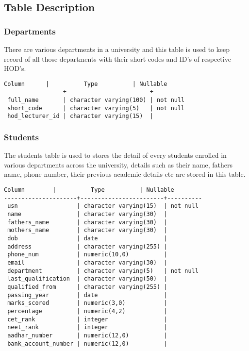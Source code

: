 \subsection{Table Description}

\subsubsection{Departments}

There are various departments in a university and this table is used to keep
record of all those departments with their short codes and ID's of respective
HOD's.

\begin{lstlisting}[basicstyle=\small]
     Column      |          Type          | Nullable
-----------------+------------------------+----------
 full_name       | character varying(100) | not null
 short_code      | character varying(5)   | not null
 hod_lecturer_id | character varying(15)  |
\end{lstlisting}

\subsubsection{Students}

The students table is used to stores the detail of every students enrolled in
various departments across the university, details such as their name, fathers
name, phone number, their previous academic details etc are stored in this
table.

\begin{lstlisting}[basicstyle=\small]
       Column        |          Type          | Nullable
---------------------+------------------------+----------
 usn                 | character varying(15)  | not null
 name                | character varying(30)  |
 fathers_name        | character varying(30)  |
 mothers_name        | character varying(30)  |
 dob                 | date                   |
 address             | character varying(255) |
 phone_num           | numeric(10,0)          |
 email               | character varying(30)  |
 department          | character varying(5)   | not null
 last_qualification  | character varying(50)  |
 qualified_from      | character varying(255) |
 passing_year        | date                   |
 marks_scored        | numeric(3,0)           |
 percentage          | numeric(4,2)           |
 cet_rank            | integer                |
 neet_rank           | integer                |
 aadhar_number       | numeric(12,0)          |
 bank_account_number | numeric(12,0)          |
\end{lstlisting}

